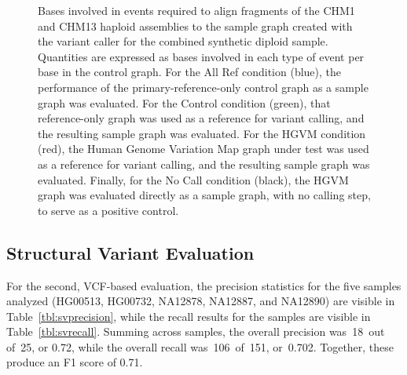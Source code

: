 \begin{figure}[H]
\caption[Mole realignment evaluation]{Bases involved in events required to align fragments of the CHM1 and CHM13 haploid assemblies to the sample graph created with the \vg variant caller for the combined synthetic diploid sample. Quantities are expressed as bases involved in each type of event per base in the control graph. For the All Ref condition (blue), the performance of the primary-reference-only control graph as a sample graph was evaluated. For the Control condition (green), that reference-only graph was used as a reference for variant calling, and the resulting sample graph was evaluated. For the HGVM condition (red), the Human Genome Variation Map graph under test was used as a reference for variant calling, and the resulting sample graph was evaluated. Finally, for the No Call condition (black), the HGVM graph was evaluated directly as a sample graph, with no calling step, to serve as a positive control.}
\label{fig:molerealignment}
\end{figure}

\subsection{Structural Variant Evaluation}
\label{subsec:structuralvarianteval}

For the second, VCF-based evaluation, the precision statistics for the five samples analyzed (HG00513, HG00732, NA12878, NA12887, and NA12890) are visible in Table~\ref{tbl:svprecision}, while the recall results for the samples are visible in Table~\ref{tbl:svrecall}.
Summing across samples, the overall precision was~18~out of~25, or 0.72, while the overall recall was~106~of~151, or~0.702. Together, these produce an F1 score of 0.71.

\newcommand{\true}{\textbullet}
\newcommand{\false}{}

